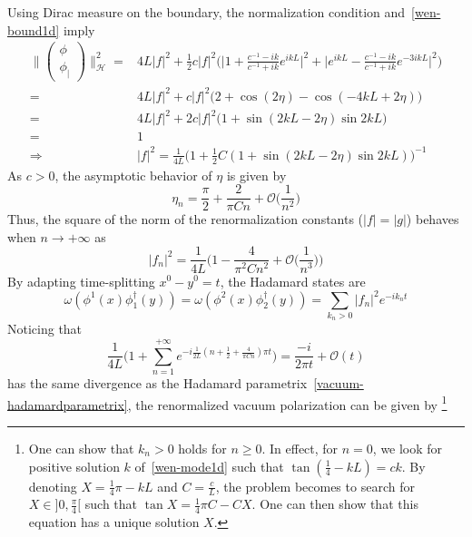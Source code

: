 Using Dirac measure on the boundary, 
the normalization condition and~\cref{wen-bound1d} imply
\begin{equation*}
\begin{split}
\Big\| \begin{pmatrix} \phi \\  \phi_| \end{pmatrix} \Big\|^2_{\mathcal{H}}  = &
4L |f|^2 + \frac 1 2 c |f|^2 \bigg( \Big| 1 + \frac{c^{-1} - ik}{c^{-1} + ik}e^{ikL} \Big|^2
+ \Big| e^{ikL} - \frac{c^{-1} - ik}{c^{-1} + ik}e^{-3ikL} \Big|^2
\bigg) \\
%
=& 4L |f|^2 + c |f|^2 \big(2 + \cos(2\eta) - \cos(-4kL + 2\eta) \big) \\
%
=& 4L |f|^2 +2 c |f|^2 \big(1 + \sin(2kL - 2\eta) \sin 2kL  \big) \\
= & 1 \\
\Rightarrow &
|f|^2 = \frac{1}{4L} \Big( 1 + \frac 1 2 C (1 + \sin(2kL-2\eta) \sin 2kL ) \Big)^{-1}
\end{split}
\end{equation*}
As $c> 0 $, the asymptotic behavior of $\eta$ is given by
\begin{equation*}
\eta_n = \frac \pi 2 + \frac{2}{\pi Cn} + \mathcal{O}\big(\frac{1}{n^2}\big)
\end{equation*}
Thus, the square of the norm of the renormalization constants ($|f| = |g|$) behaves when $n\rightarrow +\infty$ as
\begin{equation*}
|f_n|^2 = 
\frac{1}{4L}\Big( 1 - \frac{4}{\pi^2C n^2} + \mathcal{O}\big(\frac{1}{n^3}\big) \Big)
\end{equation*}
By adapting time-splitting $x^0 - y^0 = t$, the Hadamard states are
\begin{equation*}
\omega(\phi^1(x)\phi^\dagger_1(y)) = \omega(\phi^2(x)\phi^\dagger_2(y)) = 
 \sum_{k_n>0} |f_n|^2 e^{-ik_nt}
\end{equation*} 
Noticing that 
\begin{equation*}
\frac{ 1}{ 4L}\Big(1+\sum_{n=1}^{+\infty} e^{-i\frac{1}{2L}(n+\frac 1 2 + \frac{4}{\pi C n} ) \pi t} \Big)
= \frac{-i}{2\pi t} + \mathcal{O}(t)
\end{equation*}
has the same divergence as the Hadamard parametrix~\cref{vacuum-hadamardparametrix}, the renormalized vacuum polarization can be given by
\footnote{
One can show that $k_n > 0$ holds for $n \geq 0$. In effect, for $n = 0$, we look for positive solution $k$ of~\cref{wen-mode1d} such that $\tan(\frac 1 4 - kL) = ck$. By denoting $X = \frac 1 4 \pi - kL$ and $C = \frac c L$, the problem becomes to search for $X \in ] 0, \frac \pi 4[$ such that $\tan X = \frac 1 4 \pi C - C X$. One can then show that this equation has a unique solution $X$.
}
